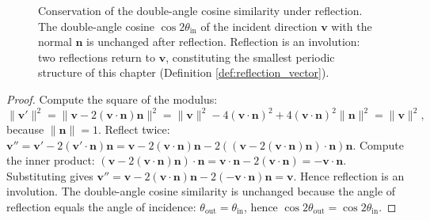 \begin{figure}[htbp]
    \centering
    \caption{Conservation of the double-angle cosine similarity under reflection. The double-angle cosine $\cos 2\theta_{\text{in}}$ of the incident direction $\mathbf{v}$ with the normal $\mathbf{n}$ is unchanged after reflection. Reflection is an involution: two reflections return to $\mathbf{v}$, constituting the smallest periodic structure of this chapter (Definition \ref{def:reflection_vector}).}
    \label{fig:reflection_conservation}
\end{figure}

\begin{proof}
Compute the square of the modulus:
\[\|\mathbf{v}'\|^2 = \|\mathbf{v} - 2(\mathbf{v}\cdot\mathbf{n})\mathbf{n}\|^2 = \|\mathbf{v}\|^2 - 4(\mathbf{v}\cdot\mathbf{n})^2 + 4(\mathbf{v}\cdot\mathbf{n})^2\|\mathbf{n}\|^2 = \|\mathbf{v}\|^2,\]
because $\|\mathbf{n}\|=1$. Reflect twice: $\mathbf{v}'' = \mathbf{v}' - 2(\mathbf{v}'\cdot\mathbf{n})\mathbf{n} = \mathbf{v} - 2(\mathbf{v}\cdot\mathbf{n})\mathbf{n} - 2((\mathbf{v} - 2(\mathbf{v}\cdot\mathbf{n})\mathbf{n})\cdot\mathbf{n})\mathbf{n}$. Compute the inner product: $(\mathbf{v} - 2(\mathbf{v}\cdot\mathbf{n})\mathbf{n})\cdot\mathbf{n} = \mathbf{v}\cdot\mathbf{n} - 2(\mathbf{v}\cdot\mathbf{n}) = -\mathbf{v}\cdot\mathbf{n}$. Substituting gives $\mathbf{v}'' = \mathbf{v} - 2(\mathbf{v}\cdot\mathbf{n})\mathbf{n} - 2(-\mathbf{v}\cdot\mathbf{n})\mathbf{n} = \mathbf{v}$. Hence reflection is an involution. The double-angle cosine similarity is unchanged because the angle of reflection equals the angle of incidence: $\theta_{\text{out}} = \theta_{\text{in}}$, hence $\cos 2\theta_{\text{out}} = \cos 2\theta_{\text{in}}$.
\end{proof}

